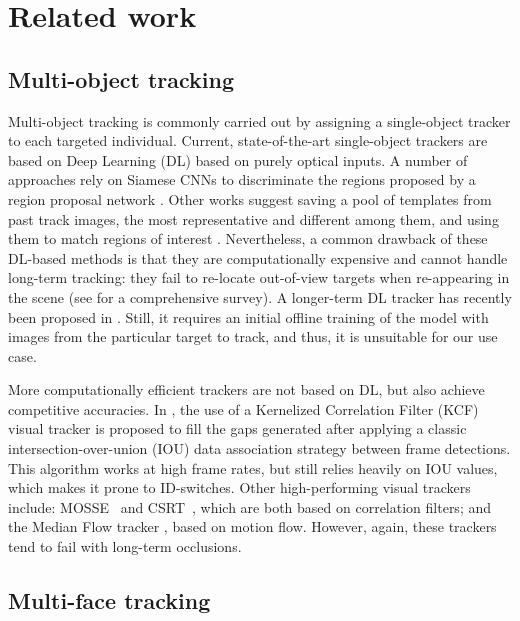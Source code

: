 \section{Related work}


\subsection{Multi-object tracking}

Multi-object tracking is commonly carried out by assigning a single-object tracker to  each targeted individual. Current,  state-of-the-art single-object trackers are based on Deep Learning (DL) based on purely optical inputs. A number of approaches rely on Siamese CNNs to discriminate the regions proposed by a region proposal network \cite{zhu2018dasiamrpn, li2019siamrpn++, wang2019siammask, voigtlaender2019trackingsegm}. Other works suggest saving a pool of templates from past track images, the most representative and different among them, and using them to match regions of interest \cite{sauer2019holistic}. Nevertheless, a common drawback of these DL-based methods is that they are computationally expensive and cannot handle long-term tracking: they fail to re-locate out-of-view targets when re-appearing in the scene (see \cite{lin2019mobiface} for a comprehensive survey). A longer-term DL tracker has recently been proposed in \cite{wangtracking}. Still, it requires an initial offline training of the model with images from the particular target to track, and thus, it is unsuitable for our use case.

More computationally efficient trackers are not based on DL, but also achieve competitive accuracies. In \cite{bochinski2018viou}, the use of a Kernelized Correlation Filter (KCF) visual tracker is proposed to fill the gaps generated after applying a classic intersection-over-union (IOU) data association strategy between frame detections. This algorithm works at high frame rates, but still relies heavily on IOU values, which makes it prone to ID-switches. Other high-performing visual trackers include: MOSSE~\cite{bolme2010visual} and CSRT~\cite{lukezic2017discriminative}, which are both based on correlation filters; and the Median Flow tracker \cite{kalal2010forward}, based on motion flow. However, again, these trackers tend to fail with long-term occlusions.

\subsection{Multi-face tracking}

